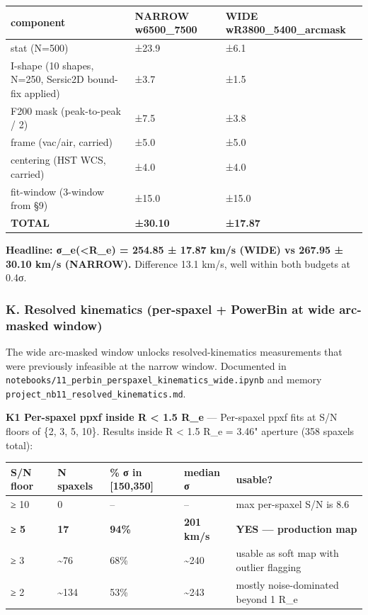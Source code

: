 \documentclass[
  10pt,
]{article}
\begin{document}
\begingroup\small\setlength{\tabcolsep}{4pt}\begin{longtable}[]{@{}lll@{}}
\toprule
component & NARROW w6500\_7500 & WIDE wR3800\_5400\_arcmask \\
\midrule
\endhead
stat (N=500) & ±23.9 & ±6.1 \\
I-shape (10 shapes, N=250, Sersic2D bound-fix applied) & ±3.7 & ±1.5 \\
F200 mask (peak-to-peak / 2) & ±7.5 & ±3.8 \\
frame (vac/air, carried) & ±5.0 & ±5.0 \\
centering (HST WCS, carried) & ±4.0 & ±4.0 \\
fit-window (3-window from §9) & ±15.0 & ±15.0 \\
\textbf{TOTAL} & \textbf{±30.10} & \textbf{±17.87} \\
\bottomrule
\end{longtable}\endgroup

\textbf{Headline: σ\_e(\textless R\_e) = 254.85 ± 17.87 km/s (WIDE) vs 267.95 ± 30.10 km/s (NARROW).} Difference 13.1 km/s, well within both budgets at 0.4σ.

\hypertarget{k.-resolved-kinematics-per-spaxel-powerbin-at-wide-arc-masked-window}{%
\subsubsection{K. Resolved kinematics (per-spaxel + PowerBin at wide arc-masked window)}\label{k.-resolved-kinematics-per-spaxel-powerbin-at-wide-arc-masked-window}}

The wide arc-masked window unlocks resolved-kinematics measurements that were previously infeasible at the narrow window. Documented in \texttt{notebooks/11\_perbin\_perspaxel\_kinematics\_wide.ipynb}
and memory \texttt{project\_nb11\_resolved\_kinematics.md}.

\textbf{K1 Per-spaxel ppxf inside R \textless{} 1.5 R\_e} --- Per-spaxel ppxf fits at S/N floors of \{2, 3, 5, 10\}. Results inside R \textless{} 1.5 R\_e = 3.46" aperture (358 spaxels total):

\begingroup\small\setlength{\tabcolsep}{4pt}\begin{longtable}[]{@{}lllll@{}}
\toprule
S/N floor & N spaxels & \% σ in {[}150,350{]} & median σ & usable? \\
\midrule
\endhead
≥ 10 & 0 & -- & -- & max per-spaxel S/N is 8.6 \\
\textbf{≥ 5} & \textbf{17} & \textbf{94\%} & \textbf{201 km/s} & \textbf{YES --- production map} \\
≥ 3 & \textasciitilde76 & 68\% & \textasciitilde240 & usable as soft map with outlier flagging \\
≥ 2 & \textasciitilde134 & 53\% & \textasciitilde243 & mostly noise-dominated beyond 1 R\_e \\
\bottomrule
\end{longtable}\endgroup
\end{document}

